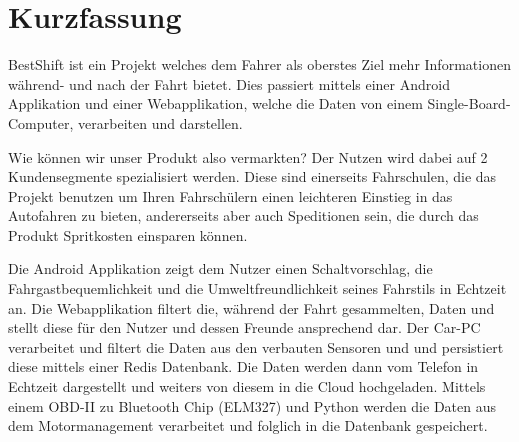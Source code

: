 \chapter{Kurzfassung}
BestShift ist ein Projekt welches dem Fahrer als oberstes Ziel mehr Informationen während- und nach der Fahrt bietet. 
Dies passiert mittels einer Android Applikation und einer Webapplikation, welche die Daten von einem Single-Board-Computer, verarbeiten und darstellen. 

\newline
Wie können wir unser Produkt also vermarkten?
Der Nutzen wird dabei auf 2 Kundensegmente spezialisiert werden.
Diese sind einerseits Fahrschulen, die das Projekt benutzen um Ihren Fahrschülern einen leichteren Einstieg in das Autofahren zu bieten, andererseits aber auch Speditionen sein, die durch das Produkt Spritkosten einsparen können.

\newline
Die Android Applikation zeigt dem Nutzer einen Schaltvorschlag, die Fahrgastbequemlichkeit und die Umweltfreundlichkeit seines Fahrstils in Echtzeit an. 
Die Webapplikation filtert die, während der Fahrt gesammelten, Daten  und stellt diese für den Nutzer und dessen Freunde ansprechend dar. 
Der Car-PC verarbeitet und filtert die Daten aus den verbauten Sensoren und  und persistiert diese mittels einer Redis Datenbank. Die Daten werden dann vom Telefon in Echtzeit dargestellt und weiters von diesem in die Cloud hochgeladen. Mittels einem OBD-II zu Bluetooth Chip (ELM327) und Python werden die Daten aus dem Motormanagement verarbeitet und folglich in die Datenbank gespeichert.